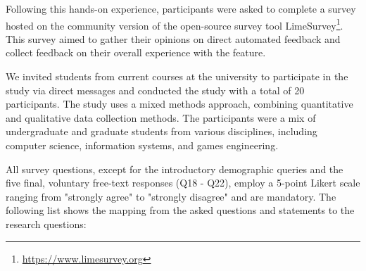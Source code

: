 \documentclass[manuscript,screen,review]{acmart}
\begin{document}
Following this hands-on experience, participants were asked to complete a survey hosted on the community version of the open-source survey tool LimeSurvey\footnote{\url{https://www.limesurvey.org}}.
This survey aimed to gather their opinions on direct automated feedback and collect feedback on their overall experience with the feature.

We invited students from current courses at the university to participate in the study via direct messages and conducted the study with a total of 20 participants.
The study uses a mixed methods approach, combining quantitative and qualitative data collection methods. 
The participants were a mix of undergraduate and graduate students from various disciplines, including computer science, information systems, and games engineering.

All survey questions, except for the introductory demographic queries and the five final, voluntary free-text responses (Q18 - Q22), employ a 5-point Likert scale \cite{allen:2007:LikertScalesData} ranging from "strongly agree" to "strongly disagree" and are mandatory.
The following list shows the mapping from the asked questions and statements to the research questions:
\end{document}
